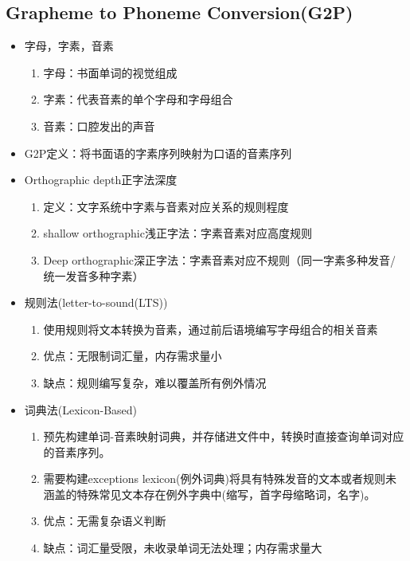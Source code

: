 \documentclass[UTF8]{ctexart}
\begin{document}
\subsection{Grapheme to Phoneme Conversion(G2P)}

\begin{itemize}
    \item 字母，字素，音素
    \begin{enumerate}
        \item 字母：书面单词的视觉组成
        \item 字素：代表音素的单个字母和字母组合
        \item 音素：口腔发出的声音
    \end{enumerate}

    \item G2P定义：将书面语的字素序列映射为口语的音素序列
    
    \item Orthographic depth正字法深度
    \begin{enumerate}
        \item 定义：文字系统中字素与音素对应关系的规则程度
        \item shallow orthographic浅正字法：字素音素对应高度规则
        \item Deep orthographic深正字法：字素音素对应不规则（同一字素多种发音/统一发音多种字素）
    \end{enumerate}

    \item 规则法(letter-to-sound(LTS))
    
    \begin{enumerate}
        \item 使用规则将文本转换为音素，通过前后语境编写字母组合的相关音素
        \item 优点：无限制词汇量，内存需求量小
        \item 缺点：规则编写复杂，难以覆盖所有例外情况
    \end{enumerate}

    \item 词典法(Lexicon-Based)
    
    \begin{enumerate}
        \item 预先构建单词-音素映射词典，并存储进文件中，转换时直接查询单词对应的音素序列。
        \item 需要构建exceptions lexicon(例外词典)将具有特殊发音的文本或者规则未涵盖的特殊常见文本存在例外字典中(缩写，首字母缩略词，名字)。
        \item 优点：无需复杂语义判断
        \item 缺点：词汇量受限，未收录单词无法处理；内存需求量大
    \end{enumerate}


\end{itemize}
\end{document}
